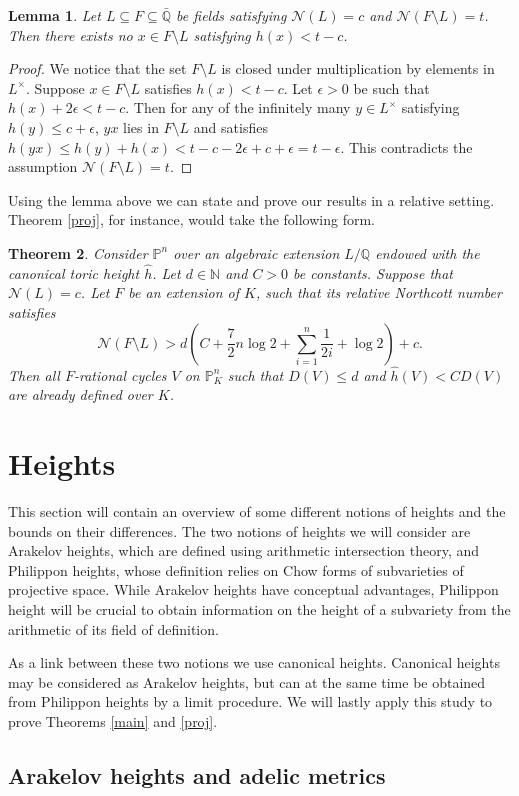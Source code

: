 \documentclass[11pt, a4paper, UKenglish]{amsart}
\newcommand{\N}{\mathcal N}
\newcommand{\Q}{\mathbb{Q}}
\newcommand{\Qbar}{\bar{\mathbb{Q}}}
\renewcommand{\t}{\times}
\newcommand{\bbN}{\mathbb{N}}
\newcommand{\bbP}{\mathbb{P}}
\newcommand{\eqn}[1]{\begin{equation*}#1\end{equation*}}
\newtheorem{thm_}{Theorem}[section]
\newtheorem{lemma_}[thm_]{Lemma}
\theoremstyle{definition}
\newcommand{\thm}[1]{\begin{thm_}#1\end{thm_}}
\newcommand{\lemm}[1]{\begin{lemma_}#1\end{lemma_}}
\newcommand{\pf}[1]{\begin{proof}#1\end{proof}}
\begin{document}
\lemm{Let $L \subseteq F \subseteq \Qbar$ be fields satisfying $\N(L)=c$ and $\N(F\setminus L) = t$. Then there exists no $x\in F\setminus L$ satisfying $h(x) < t-c$.}

\pf{We notice that the set $F\setminus L$ is closed under multiplication by elements in $L^\t$. Suppose $x \in F\setminus L$ satisfies $h(x) < t-c$. Let $\epsilon > 0$ be such that $h(x)+2\epsilon < t-c$. Then for any of the infinitely many $y\in L^\t$ satisfying $h(y) \leq c+\epsilon$, $yx$ lies in $F\setminus L$ and satisfies $h(yx) \leq h(y) + h(x) < t-c-2\epsilon+c+\epsilon = t-\epsilon$. This contradicts the assumption $\N(F\setminus L) = t$.}

Using the lemma above we can state and prove our results in a relative setting. Theorem \ref{proj}, for instance, would take the following form.


\thm{Consider $\bbP^n$ over an algebraic extension $L/\Q$ endowed with the canonical toric height $\hat{h}$. Let $d \in \bbN$ and $C > 0$ be constants. Suppose that $\N(L) = c$. Let $F$ be an extension of $K$, such that its relative Northcott number satisfies 
\eqn{\N(F\setminus L) > d\left(C + \frac{7}{2} n\log 2  + \sum_{i = 1}^n \frac{1}{2i} +\log 2\right) + c.}
Then all $F$-rational cycles $V$ on $\bbP^n_{K}$ such that $D(V) \leq d$ and $\hat{h}(V) < CD(V)$ are already defined over $K$.
}


\section{Heights}

This section will contain an overview of some different notions of heights and the bounds on their differences. The two notions of heights we will consider are Arakelov heights, which are defined using arithmetic intersection theory, and Philippon heights, whose definition relies on Chow forms of subvarieties of projective space. While Arakelov heights have conceptual advantages, Philippon height will be crucial to obtain information on the height of a subvariety from the arithmetic of its field of definition.

As a link between these two notions we use canonical heights. Canonical heights may be considered as Arakelov heights, but can at the same time be obtained from Philippon heights by a limit procedure. We will lastly apply this study to prove Theorems \ref{main} and \ref{proj}.

\subsection{Arakelov heights and adelic metrics}
\end{document}
